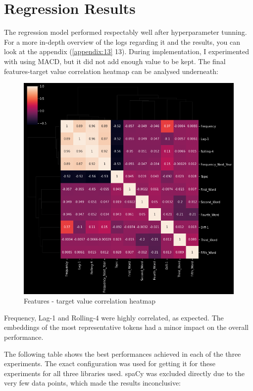 \documentclass[12pt,MSc,a4paper,oneside]{muthesis}
\begin{document}
\section{Regression Results}
The regression model performed respectably well after hyperparameter tunning. For a more in-depth overview of the logs regarding it and the results, you can look at the appendix (\ref{appendix:13} 13). 
During implementation, I experimented with using MACD, but it did not add enough value to be kept. The final features-target value correlation heatmap can be analysed underneath:
\begin{figure}[h]
    \centering
    \includegraphics[scale=0.25]{regression_features_corellation.png}
    \caption{Features - target value correlation heatmap}
\end{figure}

Frequency, Lag-1 and Rolling-4 were highly correlated, as expected. The embeddings of the most representative tokens had a minor impact on the overall performance.

The following table shows the best performances achieved in each of the three experiments. The exact configuration was used for getting it for these experiments for all three libraries used. spaCy was excluded directly due to the very few data points, which made the results inconclusive:
\end{document}
